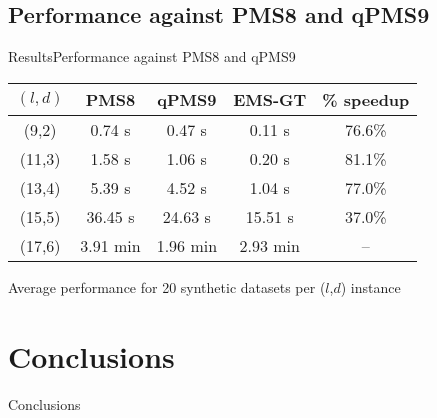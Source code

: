 \documentclass[pdf,xcolor={dvipsnames}]{beamer}
\begin{document}
	\subsection{Performance against PMS8 and qPMS9}
	\begin{frame}{Results}{Performance against PMS8 and qPMS9}

		\begin{table}[ht] %
			\small
			\renewcommand{\arraystretch}{1.3}
			\label{tbl:runtimes_v_pms}
			\centering
			\begin{tabular}{|c|c|c|c|c|}
			\hline \bfseries{\boldmath $(l,d)$} & \bfseries PMS8 & \bfseries qPMS9 & \bfseries EMS-GT & \bfseries \% speedup\\
			\hline
			 (9,2) &  0.74 s  &  0.47 s & {\color{blue} 0.11 s} & 76.6\%\\
			(11,3) &  1.58 s  &  1.06 s & {\color{blue} 0.20 s} & 81.1\%\\
			(13,4) &  5.39 s  &  4.52 s & {\color{blue} 1.04 s} & 77.0\%\\
			(15,5) & 36.45 s  & 24.63 s & {\color{blue}15.51 s} & 37.0\%\\
			(17,6) &  3.91 min & {\color{blue}1.96 min} & {2.93 min} & --\\
			\hline\end{tabular}
			\end{table}

		{\centering \footnotesize Average performance for 20 synthetic datasets per ($l$,$d$) instance \\}

		\end{frame}

\section{Conclusions}
	\begin{frame}{Conclusions}

		\end{frame}
\end{document}

